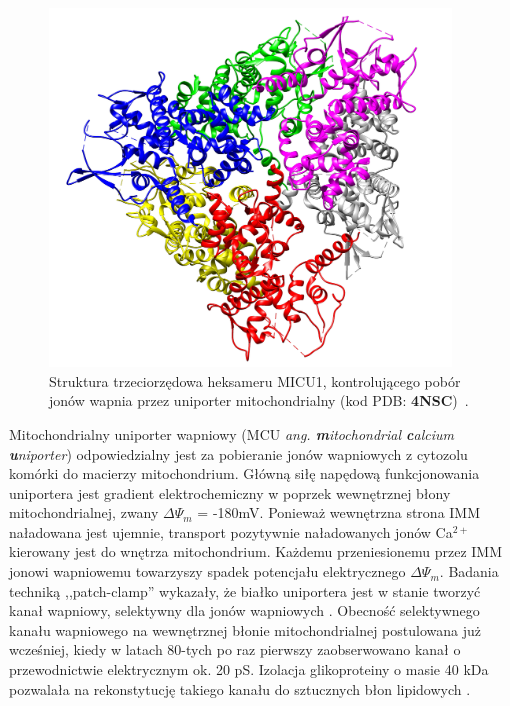 \begin{figure}[tb]
\centering
\includegraphics[width=0.95\textwidth]{rysunki/rozdzial_1/micu1.png}
\caption[Mitochondrium i ER - mikrografia]{Struktura trzeciorzędowa heksameru MICU1, kontrolującego pobór jonów wapnia przez uniporter mitochondrialny (kod PDB: \textbf{4NSC})~\cite{Wang2014}.}
\label{fig:micu1}
\end{figure}


Mitochondrialny uniporter wapniowy (MCU \textit{ang. \textbf{m}itochondrial \textbf{c}alcium \textbf{u}niporter}) odpowiedzialny jest za pobieranie jonów wapniowych z cytozolu komórki do macierzy mitochondrium. Główną siłę napędową funkcjonowania uniportera jest gradient elektrochemiczny w poprzek wewnętrznej błony mitochondrialnej, zwany $\Delta\Psi_m$ = -180mV. Ponieważ wewnętrzna strona IMM naładowana jest ujemnie, transport pozytywnie naładowanych jonów Ca$^{2+}$ kierowany jest do wnętrza mitochondrium. Każdemu przeniesionemu przez IMM jonowi wapniowemu towarzyszy spadek potencjału elektrycznego $\Delta\Psi_m$. Badania techniką ,,patch-clamp'' wykazały, że białko uniportera jest w stanie tworzyć kanał wapniowy, selektywny dla jonów wapniowych \cite{Kirichok2004}. Obecność selektywnego kanału wapniowego na wewnętrznej błonie mitochondrialnej postulowana już wcześniej, kiedy w latach 80-tych po raz pierwszy zaobserwowano kanał o przewodnictwie elektrycznym ok. 20 pS. Izolacja glikoproteiny o masie 40 kDa pozwalała na rekonstytucję takiego kanału do sztucznych błon lipidowych \cite{Debska-Vielhaber2006}.

